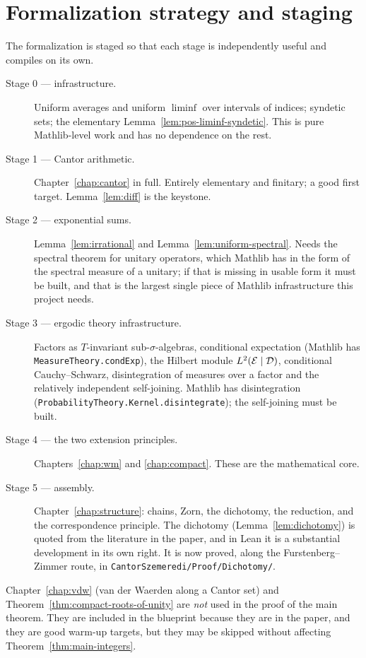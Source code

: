 \section{Formalization strategy and staging}

The formalization is staged so that each stage is independently useful and compiles on its own.

\begin{description}
  \item[Stage 0 --- infrastructure.]  Uniform averages and uniform $\liminf$ over intervals of
    indices; syndetic sets; the elementary Lemma~\ref{lem:pos-liminf-syndetic}.  This is pure
    Mathlib-level work and has no dependence on the rest.
  \item[Stage 1 --- Cantor arithmetic.]  Chapter~\ref{chap:cantor} in full.  Entirely
    elementary and finitary; a good first target.  Lemma~\ref{lem:diff} is the keystone.
  \item[Stage 2 --- exponential sums.]  Lemma~\ref{lem:irrational} and
    Lemma~\ref{lem:uniform-spectral}.  Needs the spectral theorem for unitary operators, which
    Mathlib has in the form of the spectral measure of a unitary; if that is missing in usable
    form it must be built, and that is the largest single piece of Mathlib infrastructure this
    project needs.
  \item[Stage 3 --- ergodic theory infrastructure.]  Factors as $T$-invariant sub-$\sigma$-algebras,
    conditional expectation (Mathlib has \texttt{MeasureTheory.condExp}), the Hilbert module
    $L^2(\mathcal{E} \mid \mathcal{D})$, conditional Cauchy--Schwarz, disintegration of measures over a factor
    and the relatively independent self-joining.  Mathlib has disintegration
    (\texttt{ProbabilityTheory.Kernel.disintegrate}); the self-joining must be built.
  \item[Stage 4 --- the two extension principles.]  Chapters~\ref{chap:wm} and \ref{chap:compact}.
    These are the mathematical core.
  \item[Stage 5 --- assembly.]  Chapter~\ref{chap:structure}: chains, Zorn, the dichotomy, the
    reduction, and the correspondence principle.  The dichotomy (Lemma~\ref{lem:dichotomy}) is
    quoted from the literature in the paper, and in Lean it is a substantial development in its
    own right.  It is now proved, along the Furstenberg--Zimmer route, in
    \texttt{CantorSzemeredi/Proof/Dichotomy/}.
\end{description}

\begin{remark}
  Chapter~\ref{chap:vdw} (van der Waerden along a Cantor set) and
  Theorem~\ref{thm:compact-roots-of-unity} are \emph{not} used in the proof of the main theorem.
  They are included in the blueprint because they are in the paper, and they are good
  warm-up targets, but they may be skipped without affecting Theorem~\ref{thm:main-integers}.
\end{remark}
